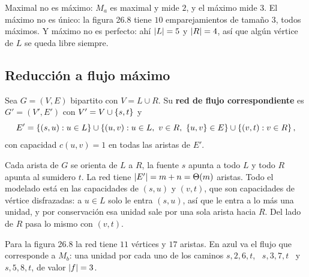 \documentclass[11pt,letterpaper]{article}
\begin{document}
\begin{ojo}
  Maximal no es máximo: $M_a$ es maximal y mide $2$, y el máximo mide
  $3$. El máximo no es único: la figura 26.8 tiene $10$
  emparejamientos de tamaño $3$, todos máximos. Y máximo no es
  perfecto: ahí $\left\lvert L \right\rvert = 5$ y $\left\lvert R \right\rvert = 4$, así que algún vértice
  de $L$ se queda libre siempre.
\end{ojo}


\subsection*{Reducción a flujo máximo}

\begin{definicion}
  \label{def:red-emparejamiento}
  Sea $G = (V, E)$ bipartito con $V = L \cup R$. Su \textbf{red de
  flujo correspondiente} es $G' = (V', E')$ con
  $V' = V \cup \left\{ s, t \right\}$ y
  \[
    E' = \left\{ (s, u) : u \in L \right\}
         \cup \left\{ (u, v) : u \in L,\ v \in R,\ \left\{ u, v \right\} \in E \right\}
         \cup \left\{ (v, t) : v \in R \right\} ,
  \]
  con capacidad $c(u, v) = 1$ en todas las aristas de $E'$.
\end{definicion}

Cada arista de $G$ se orienta de $L$ a $R$, la fuente $s$ apunta a
todo $L$ y todo $R$ apunta al sumidero $t$. La red tiene
$\left\lvert E' \right\rvert = m + n = \Theta\!\left(m\right)$ aristas. Todo el modelado está en las
capacidades de $(s, u)$ y $(v, t)$, que son capacidades de vértice
disfrazadas: a $u \in L$ solo le entra $(s, u)$, así que le entra a lo
más una unidad, y por conservación esa unidad sale por una sola arista
hacia $R$. Del lado de $R$ pasa lo mismo con $(v, t)$.

Para la figura 26.8 la red tiene $11$ vértices y $17$ aristas. En
azul va el flujo que corresponde a $M_b$: una unidad por cada uno de
los caminos $s, 2, 6, t$, \ $s, 3, 7, t$ \ y \ $s, 5, 8, t$, de valor
$\left\lvert f \right\rvert = 3$.

\begin{center}
\end{center}
\end{document}

